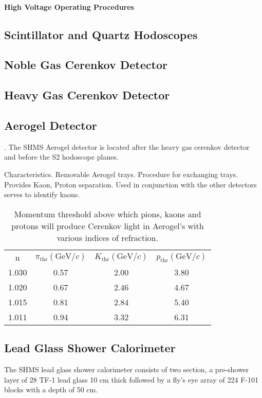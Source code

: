 \paragraph{High Voltage Operating Procedures}

\subsection{Scintillator and Quartz Hodoscopes}

\subsection{Noble Gas Cerenkov Detector}

\subsection{Heavy Gas Cerenkov Detector}

\subsection{Aerogel Detector}
.
The SHMS Aerogel detector is located after the heavy gas cerenkov
detector and before the S2 hodoscope planes.

Characteristics.  Removable Aerogel trays.  Procedure for exchanging
trays.  Provides Kaon, Proton separation. Used in conjunction with the
other detectors serves to identify kaons.

\begin{table}
\caption{Momentum threshold above which pions, kaons and protons will 
produce Cerenkov light in Aerogel's with various indices of refraction.
\label{tab:shms_aerogel}}
\begin{center}
\begin{tabular}{cccc}
  n& $\pi_{\textrm{thr}}(\textrm{GeV}/c)$ & $K_{\textrm{
  thr}}(\textrm{GeV}/c)$ & $p_{\textrm{thr}}(\textrm{GeV}/c)$\\
  1.030 & 0.57 & 2.00 & 3.80 \\
  1.020 & 0.67 & 2.46 & 4.67 \\
  1.015 & 0.81 & 2.84 & 5.40 \\
  1.011 & 0.94 & 3.32 & 6.31 \\
\end{tabular}
\end{center}
\end{table}



\subsection{Lead Glass Shower Calorimeter}

The SHMS lead glass shower calorimeter consists of two section, a
pre-shower layer of 28 TF-1 lead glass 10 cm thick followed by a fly's eye
array of 224 F-101 blocks with a depth of 50 cm.



